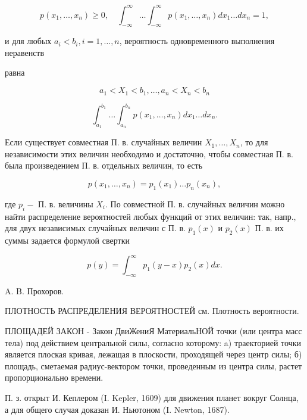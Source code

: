\documentclass[10pt]{article}
\begin{document}
\[

p\left(x_{1}, \ldots, x_{n}\right) \geqslant 0, \quad \int_{-\infty}^{\infty} \ldots \int_{-\infty}^{\infty} p\left(x_{1}, \ldots, x_{n}\right) d x_{1} \ldots d x_{n}=1,

\]



и для любых $a_{i}<b_{i}, i=1, \ldots, n$, вероятность одновременного выполнения неравенств



равна



\[

a_{1}<X_{1}<b_{1}, \ldots, a_{n}<X_{n}<b_{n}

\]



\[

\int_{a_{1}}^{b_{1}} \ldots \int_{a_{n}}^{b_{n}} p\left(x_{1}, \ldots, x_{n}\right) d x_{1} \ldots d x_{n} .

\]



Если существует совместная П. в. случайных величин $X_{1}, \ldots, X_{n}$, то для независимости этих величин необходимо и достаточно, чтобы совместная П. в. была произведением П. в. отдельных величин, то есть



\[

p\left(x_{1}, \ldots, x_{n}\right)=p_{1}\left(x_{1}\right) \ldots p_{n}\left(x_{n}\right),

\]



где $p_{i}-$ П. в. величины $X_{i}$. По совместной П. в. случайных величин можно найти распределение вероятностей любых функций от этих величин: так, напр., для двух независимых случайных величин с П. в. $p_{1}(x)$ и $p_{2}(x)$ П. в. их суммы задается формулой свертки



\[

p(y)=\int_{-\infty}^{\infty} p_{1}(y-x) p_{2}(x) d x .

\]



A. B. Прохоров.



ПЛОТНОСТЬ РАСПРЕДЕЛЕНИЯ ВЕРОЯТНОСТЕЙ см. Плотность вероятности.



ПЛОЩАДЕЙ ЗАКОН - Закон ДвиЖениЯ МатериальНОЙ точки (или центра масс тела) под действием центральной силы, согласно которому: a) траекторией точки является плоская кривая, лежащая в плоскости, проходящей через центр силы; б) площадь, сметаемая радиус-вектором точки, проведенным из центра силы, растет пропорционально времени.



П. з. открыт И. Кеплером (I. Kepler, 1609) для движения планет вокруг Солнца, а для общего случая доказан И. Ньютоном (I. Newton, 1687).
\end{document}
